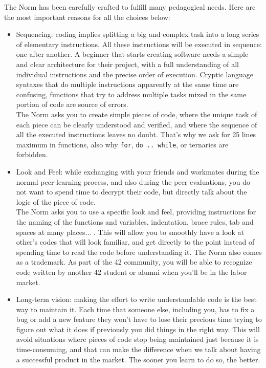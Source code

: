 \documentclass{42-ru}
\begin{document}
    The Norm has been carefully crafted to fulfill many pedagogical needs. Here
    are the most important reasons for all the choices below:
    \begin{itemize}

    \item Sequencing: coding implies splitting a big and complex task into a long series
      of elementary instructions. All these instructions will be executed in sequence:
      one after another. A beginner that starts creating software needs a simple and clear
      architecture for their project, with a full understanding of all individual instructions
      and the precise order of execution. Cryptic language syntaxes that do multiple
      instructions apparently at the same time are confusing, functions that try to address
      multiple tasks mixed in the same portion of code are source of errors.\\
      The Norm asks you to create simple pieces of code, where the unique task of each piece
      can be clearly understood and verified, and where the sequence of all the executed
      instructions leaves no doubt. That's why we ask for 25 lines maximum in functions, also why
      \texttt{for}, \texttt{do .. while}, or ternaries are forbidden.

    \item Look and Feel: while exchanging with your friends and workmates during the
      normal peer-learning process, and also during the peer-evaluations, you do not
      want to spend time to decrypt their code, but directly talk about the
      logic of the piece of code.\\
      The Norm asks you to use a specific look and feel, providing instructions for the naming
      of the functions and variables, indentation, brace rules, tab and spaces at many places... .
      This will allow you to smoothly have a look at other's codes that will look familiar,
      and get directly to the point instead of spending time to read the code before understanding it.
      The Norm also comes as a trademark. As part of the 42 community, you will be able to
      recognize code written by another 42 student or alumni when you'll be in the labor market.
    
    \item Long-term vision: making the effort to write understandable code is the
      best way to maintain it. Each time that someone else, including you, has to fix a bug
      or add a new feature they won't have to lose their precious time trying to figure out
      what it does if previously you did things in the right way. This will avoid situations
      where pieces of code stop being maintained just because it is time-consuming, and that
      can make the difference when we talk about having a successful product in the market.
      The sooner you learn to do so, the better.


\end{itemize}
\end{document}
